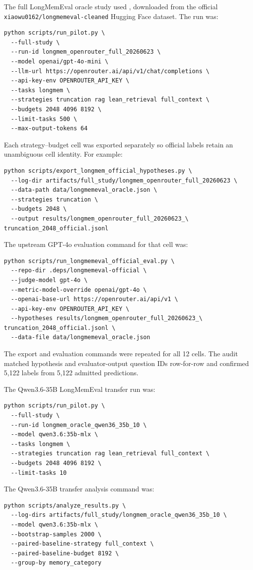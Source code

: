 \documentclass[11pt]{article}
\begin{document}
The full LongMemEval oracle study used
, downloaded from the official
\texttt{xiaowu0162/longmemeval-cleaned} Hugging Face dataset.  The run was:
\begin{verbatim}
python scripts/run_pilot.py \
  --full-study \
  --run-id longmem_openrouter_full_20260623 \
  --model openai/gpt-4o-mini \
  --llm-url https://openrouter.ai/api/v1/chat/completions \
  --api-key-env OPENROUTER_API_KEY \
  --tasks longmem \
  --strategies truncation rag lean_retrieval full_context \
  --budgets 2048 4096 8192 \
  --limit-tasks 500 \
  --max-output-tokens 64
\end{verbatim}

Each strategy--budget cell was exported separately so official labels retain
an unambiguous cell identity.  For example:
\begin{verbatim}
python scripts/export_longmem_official_hypotheses.py \
  --log-dir artifacts/full_study/longmem_openrouter_full_20260623 \
  --data-path data/longmemeval_oracle.json \
  --strategies truncation \
  --budgets 2048 \
  --output results/longmem_openrouter_full_20260623_\
truncation_2048_official.jsonl
\end{verbatim}

The upstream GPT-4o evaluation command for that cell was:
\begin{verbatim}
python scripts/run_longmemeval_official_eval.py \
  --repo-dir .deps/longmemeval-official \
  --judge-model gpt-4o \
  --metric-model-override openai/gpt-4o \
  --openai-base-url https://openrouter.ai/api/v1 \
  --api-key-env OPENROUTER_API_KEY \
  --hypotheses results/longmem_openrouter_full_20260623_\
truncation_2048_official.jsonl \
  --data-file data/longmemeval_oracle.json
\end{verbatim}
The export and evaluation commands were repeated for all 12 cells.  The audit
matched hypothesis and evaluator-output question IDs row-for-row and confirmed
5,122 labels from 5,122 admitted predictions.

The Qwen3.6-35B LongMemEval transfer run was:
\begin{verbatim}
python scripts/run_pilot.py \
  --full-study \
  --run-id longmem_oracle_qwen36_35b_10 \
  --model qwen3.6:35b-mlx \
  --tasks longmem \
  --strategies truncation rag lean_retrieval full_context \
  --budgets 2048 4096 8192 \
  --limit-tasks 10
\end{verbatim}

The Qwen3.6-35B transfer analysis command was:
\begin{verbatim}
python scripts/analyze_results.py \
  --log-dirs artifacts/full_study/longmem_oracle_qwen36_35b_10 \
  --model qwen3.6:35b-mlx \
  --bootstrap-samples 2000 \
  --paired-baseline-strategy full_context \
  --paired-baseline-budget 8192 \
  --group-by memory_category
\end{verbatim}
\end{document}
